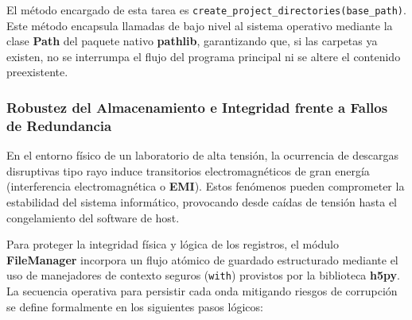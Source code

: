 El método encargado de esta tarea es \texttt{create\_project\_directories(base\_path)}. Este método encapsula llamadas de bajo nivel al sistema operativo mediante la clase \textbf{Path} del paquete nativo \textbf{pathlib}, garantizando que, si las carpetas ya existen, no se interrumpa el flujo del programa principal ni se altere el contenido preexistente.

\subsubsection{Robustez del Almacenamiento e Integridad frente a Fallos de Redundancia}
\label{subsubsec:robustez_integridad_fallos}

En el entorno físico de un laboratorio de alta tensión, la ocurrencia de descargas disruptivas tipo rayo induce transitorios electromagnéticos de gran energía (interferencia electromagnética o \textbf{EMI}). Estos fenómenos pueden comprometer la estabilidad del sistema informático, provocando desde caídas de tensión hasta el congelamiento del software de host. 

Para proteger la integridad física y lógica de los registros, el módulo \textbf{FileManager} incorpora un flujo atómico de guardado estructurado mediante el uso de manejadores de contexto seguros (\texttt{with}) provistos por la biblioteca \textbf{h5py}. La secuencia operativa para persistir cada onda mitigando riesgos de corrupción se define formalmente en los siguientes pasos lógicos:

